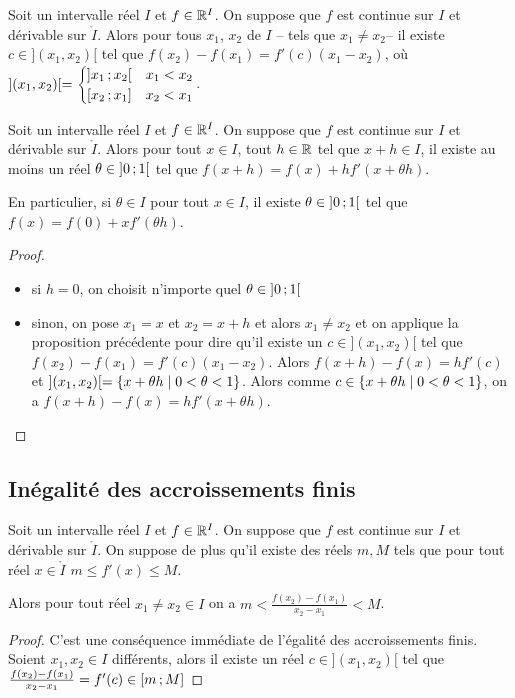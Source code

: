 \begin{prop}
  Soit un intervalle réel $I$ et $f \in \mathbb{R}^I$. On suppose que $f$ est continue sur $I$ et dérivable sur $\mathring{I}$. Alors pour tous $x_1$, $x_2$ de $I$ -- tels que $x_1 \neq x_2$-- il existe $c \in ](x_1,x_2)[$ tel que $f(x_2)-f(x_1)=f'(c)(x_1-x_2)$, où $ ](x_1,x_2)[ = \begin{cases} \left] x_1 \, ;  x_2 \right[ & x_1 < x_2 \\ \left[ x_2 \, ;  x_1 \right] & x_2 < x_1 \end{cases}$.
\end{prop}
\begin{prop}
  Soit un intervalle réel $I$ et $f \in \mathbb{R}^I$. On suppose que $f$ est continue sur $I$ et dérivable sur $\mathring{I}$. Alors pour tout $x \in I$, tout $h \in \mathbb{R}$ tel que $x+h \in I$, il existe au moins un réel $\theta \in \left] 0 \, ;  1 \right[$ tel que $f(x+h)=f(x)+hf'(x+\theta h)$. 

En particulier, si $\theta \in I$ pour tout $x \in I$, il existe $\theta \in \left] 0 \, ;  1 \right[$ tel que $f(x)=f(0)+xf'(\theta h)$.
\end{prop}
\begin{proof}
  \begin{itemize}
  \item si $h=0$, on choisit n'importe quel $\theta \in \left] 0 \, ;  1 \right[$
  \item sinon, on pose $x_1=x$ et $x_2=x+h$ et alors $x_1 \neq x_2$ et on applique la proposition précédente pour dire qu'il existe un $c \in ](x_1,x_2)[$ tel que $f(x_2)-f(x_1)=f'(c)(x_1-x_2)$. Alors $f(x+h)-f(x)=hf'(c)$ et $](x_1,x_2)[ = \left\{x+\theta h\mathrel{}\middle|\mathrel{}0 < \theta < 1\right\}$. Alors comme $c \in \left\{x+\theta h\mathrel{}\middle|\mathrel{}0 < \theta < 1\right\}$, on a $f(x+h)-f(x)=hf'(x + \theta h)$.
  \end{itemize}
\end{proof}

\subsection{Inégalité des accroissements finis}

\begin{theo}[IAF]\label{theo:iaf}
  Soit un intervalle réel $I$ et $f \in \mathbb{R}^I$. On suppose que $f$ est continue sur $I$ et dérivable sur $\mathring{I}$. On suppose de plus qu'il existe des réels $m,M$ tels que pour tout réel $x \in \mathring{I}$ $m \leqslant f'(x) \leqslant M$.

Alors pour tout réel $x_1 \neq x_2 \in I$ on a $m < \frac{f(x_2)-f(x_1)}{x_2-x_1} < M$.
\end{theo}
\begin{proof}
  C'est une conséquence immédiate de l'égalité des accroissements finis. Soient $x_1, x_2 \in I$ différents, alors il existe un réel $c \in ](x_1,x_2)[$ tel que $\frac{f(x_2)-f(x_1)}{x_2-x_1} = f'(c) \in \left[ m \, ;  M \right]$
\end{proof}

